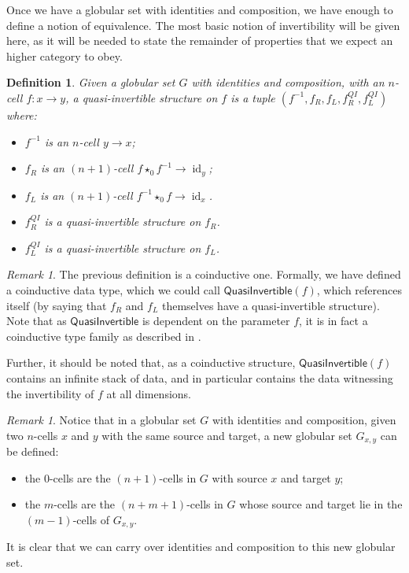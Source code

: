 \documentclass{article}
\newtheorem{definition}[theorem]{Definition} \theoremstyle{remark}
\newtheorem{remark}[theorem]{Remark} \newtheorem*{claim}{Claim}
\DeclareMathOperator{\id}{id}
\newcommand{\inv}[1]{#1^{-1}} \newcommand{\comp}{\star}
\begin{document}
Once we have a globular set with identities and composition, we have
enough to define a notion of equivalence. The most basic notion of
invertibility will be given here, as it will be needed to state the
remainder of properties that we expect an higher category to obey.

\begin{definition}
  Given a globular set \(G\) with identities and composition, with an
  \(n\)-cell \(f : x \to y\), a \emph{quasi-invertible} structure on
  \(f\) is a tuple \((\inv f, f_R, f_L, f_R^{QI}, f_L^{QI})\) where:
  \begin{itemize}
  \item \(\inv f\) is an \(n\)-cell \(y \to x\);
  \item \(f_R\) is an \((n+1)\)-cell \(f \comp_0 \inv f \to \id_y\);
  \item \(f_L\) is an \((n+1)\)-cell \(\inv f \comp_0 f \to \id_x\).
  \item \(f_R^{QI}\) is a quasi-invertible structure on \(f_R\).
  \item \(f_L^{QI}\) is a quasi-invertible structure on \(f_L\).
  \end{itemize}
\end{definition}

\begin{remark}
  The previous definition is a coinductive one. Formally, we have
  defined a coinductive data type, which we could call
  \(\mathsf{QuasiInvertible}(f)\), which references itself (by saying
  that \(f_R\) and \(f_L\) themselves have a quasi-invertible
  structure). Note that as \(\mathsf{QuasiInvertible}\) is dependent
  on the parameter \(f\), it is in fact a coinductive type family as
  described in .

  Further, it should be noted that, as a coinductive structure,
  \(\mathsf{QuasiInvertible}(f)\) contains an infinite stack of data,
  and in particular contains the data witnessing the invertibility of
  \(f\) at all dimensions.
\end{remark}

\begin{remark}\label{descendants}
  Notice that in a globular set \(G\) with identities and composition,
  given two \(n\)-cells \(x\) and \(y\) with the same source and
  target, a new globular set \(G_{x,y}\) can be defined:
  \begin{itemize}
  \item the \(0\)-cells are the \((n+1)\)-cells in \(G\) with source
    \(x\) and target \(y\);
  \item the \(m\)-cells are the \((n+m+1)\)-cells in \(G\) whose
    source and target lie in the \((m-1)\)-cells of \(G_{x,y}\).
  \end{itemize}
  It is clear that we can carry over identities and composition to
  this new globular set.
\end{remark}
\end{document}
